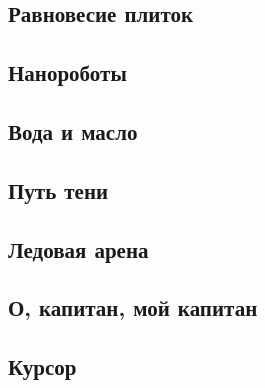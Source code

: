 %


\usepackage{xfrac}
\newcommand{\drawhex}[3][1]{
\begin{scope}[shift={#2}]
    \foreach \x in {0, ..., 6}
        \draw [#1] (\x * 60 : #3) to ( {\x * 60 + 60} : #3);    
\end{scope}
}

\newcommand{\tri}[1]{
	\draw #1 --++ (240:1) --++ (0:1) -- #1;
}


\newcommand{\nanobot}[1]{
	\foreach \x in {1,2,...,8}{
		\draw[red] #1 --++({\x*360/8 + 45/2}:.125);
	}
	\filldraw[red] #1 circle(2pt);
}

\newcommand{\pyr}[1]{
	\pgfmathsetmacro{\m}{#1};
	\foreach \x in {0,1,...,\m}{
		\foreach \y in {0,...,\x}
		\draw(\x, 0) --++(60:{\m-\x});
		\draw(60:\x) --++(-60:\x);
		\draw(60:\x) --++({\m - \x},0);
	}
}

\gradetrue


\subsection{Равновесие плиток}

\clearpage

\subsection{Нанороботы}

\clearpage

\subsection{Вода и масло}

\clearpage

\subsection{Путь тени}

\clearpage


\subsection{Ледовая арена}

\clearpage

\subsection{О, капитан, мой капитан}

\clearpage

\subsection{Курсор}

\clearpage

